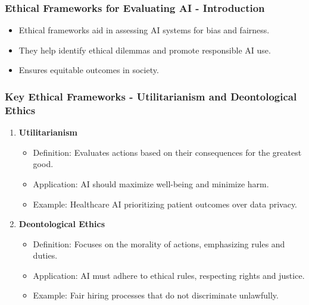 \documentclass{beamer}
\begin{document}
\begin{frame}[fragile]
    \frametitle{Ethical Frameworks for Evaluating AI - Introduction}
    \begin{itemize}
        \item Ethical frameworks aid in assessing AI systems for bias and fairness.
        \item They help identify ethical dilemmas and promote responsible AI use.
        \item Ensures equitable outcomes in society.
    \end{itemize}
\end{frame}

\begin{frame}[fragile]
    \frametitle{Key Ethical Frameworks - Utilitarianism and Deontological Ethics}
    \begin{enumerate}
        \item \textbf{Utilitarianism}
            \begin{itemize}
                \item Definition: Evaluates actions based on their consequences for the greatest good.
                \item Application: AI should maximize well-being and minimize harm.
                \item Example: Healthcare AI prioritizing patient outcomes over data privacy.
            \end{itemize}

        \item \textbf{Deontological Ethics}
            \begin{itemize}
                \item Definition: Focuses on the morality of actions, emphasizing rules and duties.
                \item Application: AI must adhere to ethical rules, respecting rights and justice.
                \item Example: Fair hiring processes that do not discriminate unlawfully.
            \end{itemize}
    \end{enumerate}
\end{frame}
\end{document}
